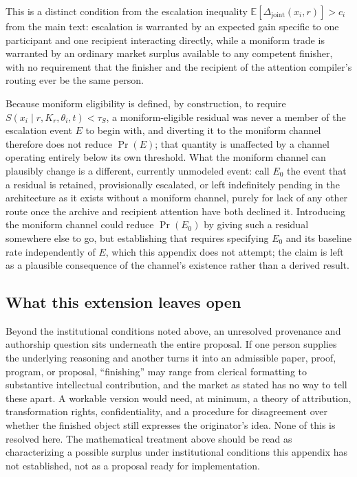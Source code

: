 \documentclass[11pt]{article}
\begin{document}
This is a distinct condition from the escalation inequality $\mathbb{E}[\Delta_{\mathrm{joint}}(x_i,r)] > c_i$ from the main text: escalation is warranted by an expected gain specific to one participant and one recipient interacting directly, while a moniform trade is warranted by an ordinary market surplus available to any competent finisher, with no requirement that the finisher and the recipient of the attention compiler's routing ever be the same person.

Because moniform eligibility is defined, by construction, to require $S(x_i \mid r, K_r, \theta_i, t) < \tau_S$, a moniform-eligible residual was never a member of the escalation event $E$ to begin with, and diverting it to the moniform channel therefore does not reduce $\Pr(E)$; that quantity is unaffected by a channel operating entirely below its own threshold. What the moniform channel can plausibly change is a different, currently unmodeled event: call $E_0$ the event that a residual is retained, provisionally escalated, or left indefinitely pending in the architecture as it exists without a moniform channel, purely for lack of any other route once the archive and recipient attention have both declined it. Introducing the moniform channel could reduce $\Pr(E_0)$ by giving such a residual somewhere else to go, but establishing that requires specifying $E_0$ and its baseline rate independently of $E$, which this appendix does not attempt; the claim is left as a plausible consequence of the channel's existence rather than a derived result.

\subsection{What this extension leaves open}

Beyond the institutional conditions noted above, an unresolved provenance and authorship question sits underneath the entire proposal. If one person supplies the underlying reasoning and another turns it into an admissible paper, proof, program, or proposal, ``finishing'' may range from clerical formatting to substantive intellectual contribution, and the market as stated has no way to tell these apart. A workable version would need, at minimum, a theory of attribution, transformation rights, confidentiality, and a procedure for disagreement over whether the finished object still expresses the originator's idea. None of this is resolved here. The mathematical treatment above should be read as characterizing a possible surplus under institutional conditions this appendix has not established, not as a proposal ready for implementation.
\end{document}
